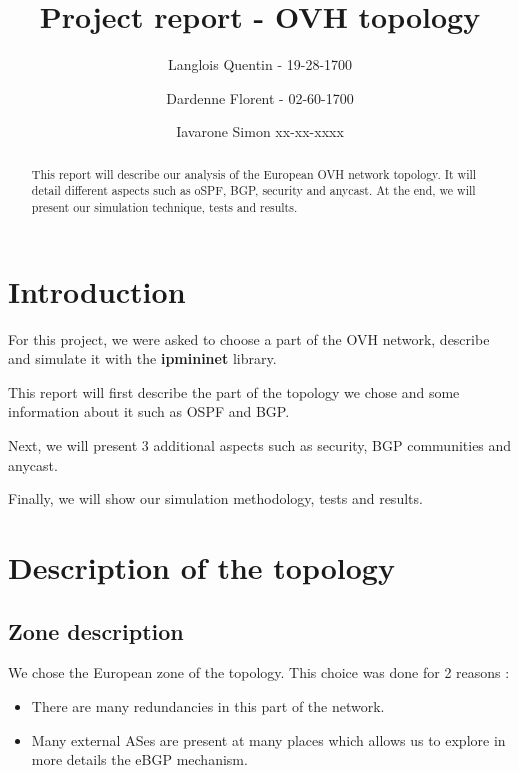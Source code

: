 \documentclass[letter, 9pt, conference]{ieeeconf}
\title{Project report - OVH topology}
\author{Langlois Quentin - 19-28-1700 \and Dardenne Florent - 02-60-1700 \and Iavarone Simon xx-xx-xxxx }
\begin{document}
\maketitle
\thispagestyle{empty}
\pagestyle{empty}


\begin{abstract}

This report will describe our analysis of the European OVH network topology. It will detail different aspects such as oSPF, BGP, security and anycast. At the end, we will present our simulation technique, tests and results. 

\end{abstract}


\section{Introduction}

For this project, we were asked to choose a part of the OVH network, describe and simulate it with the \textbf{ipmininet} library. 

This report will first describe the part of the topology we chose and some information about it such as OSPF and BGP. 

Next, we will present 3 additional aspects such as security, BGP communities and anycast. 

Finally, we will show our simulation methodology, tests and results. 

\section{Description of the topology}

\subsection{Zone description}

We chose the European zone of the topology. This choice was done for 2 reasons : 

\begin{itemize}
    \item There are many redundancies in this part of the network. 
    \item Many external ASes are present at many places which allows us to explore in more details the eBGP mechanism. 
\end{itemize}
\end{document}

